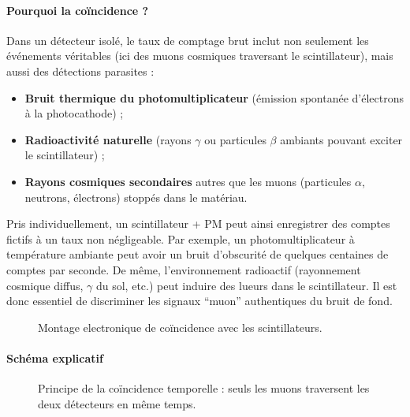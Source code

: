 \documentclass[a4paper,12pt,twoside]{article}
\begin{document}
\paragraph{Pourquoi la coïncidence ?}

Dans un détecteur isolé, le taux de comptage brut inclut non seulement les événements véritables (ici des muons cosmiques traversant le scintillateur), mais aussi des détections parasites :
\begin{itemize}
    \item \textbf{Bruit thermique du photomultiplicateur} (émission spontanée d’électrons à la photocathode) ;
    \item \textbf{Radioactivité naturelle} (rayons $\gamma$ ou particules $\beta$ ambiants pouvant exciter le scintillateur) ;
    \item \textbf{Rayons cosmiques secondaires} autres que les muons (particules $\alpha$, neutrons, électrons) stoppés dans le matériau.
\end{itemize}

Pris individuellement, un scintillateur + PM peut ainsi enregistrer des comptes fictifs à un taux non négligeable. Par exemple, un photomultiplicateur à température ambiante peut avoir un bruit d’obscurité de quelques centaines de comptes par seconde. De même, l’environnement radioactif (rayonnement cosmique diffus, $\gamma$ du sol, etc.) peut induire des lueurs dans le scintillateur. Il est donc essentiel de discriminer les signaux “muon” authentiques du bruit de fond.

\begin{figure}[H]
    \centering
    
    \caption{Montage electronique de coïncidence avec les scintillateurs.}
    \label{fig:coincidence_sans_delais}
\end{figure}

\paragraph{Schéma explicatif}

\begin{figure}[H]
    \centering
    \caption{Principe de la coïncidence temporelle : seuls les muons traversent les deux détecteurs en même temps.}
\end{figure}
\end{document}
